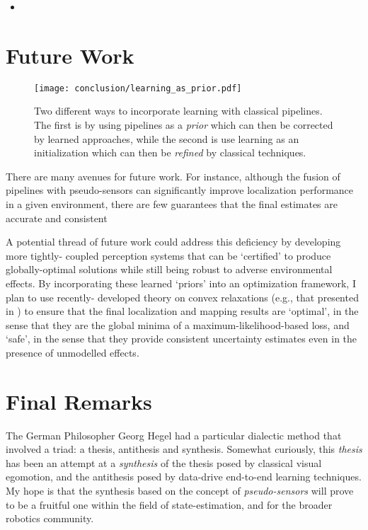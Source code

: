 \begin{itemize}
\item {}
\end{itemize}


%

\section{Future Work}

\begin{figure}
\begin{center}
		\texttt{[image: conclusion/learning\_as\_prior.pdf]}
		\caption{Two different ways to incorporate learning with classical pipelines. The first is by using pipelines as a \textit{prior} which can then be corrected by learned approaches, while the second is use learning as an initialization which can then be \textit{refined} by classical techniques.}
  	\label{fig:intro_vo_pipeline}
\end{center}
\end{figure}


There are many avenues for future work. For instance, although the fusion of pipelines with pseudo-sensors can significantly improve localization performance in a given environment, there are few guarantees that the final estimates are accurate and consistent

A potential thread of future work could address this deficiency by developing more tightly- coupled perception systems that can be ‘certified’ to produce globally-optimal solutions while still being robust to adverse environmental effects. By incorporating these learned ‘priors’ into an optimization framework, I plan to use recently- developed theory on convex relaxations (e.g., that presented in ) to ensure that the final localization and mapping results are ‘optimal’, in the sense that they are the global minima of a maximum-likelihood-based loss, and ‘safe’, in the sense that they provide consistent uncertainty estimates even in the presence of unmodelled effects. 

\section{Final Remarks}

The German Philosopher Georg Hegel had a particular dialectic method that involved a triad: a thesis, antithesis and synthesis.
Somewhat curiously, this \textit{thesis} has been an attempt at a \textit{synthesis} of the thesis posed by classical visual egomotion, and the antithesis posed by data-drive end-to-end learning techniques.
My hope is that the synthesis based on the concept of \textit{pseudo-sensors} will prove to be a fruitful one within the field of state-estimation, and for the broader robotics community.